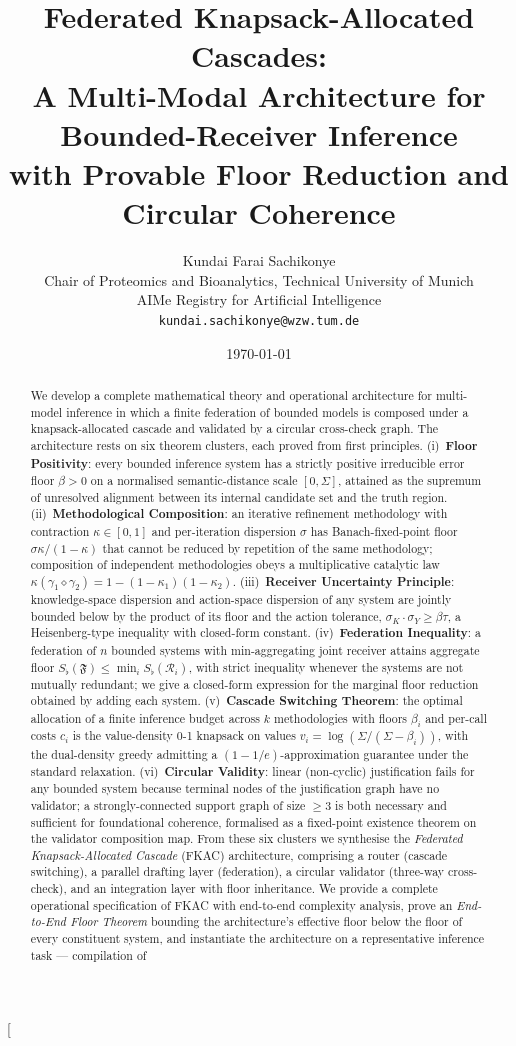\documentclass[11pt,twocolumn,a4paper]{article}
\title{\textbf{Federated Knapsack-Allocated Cascades:\\[3pt]
A Multi-Modal Architecture for Bounded-Receiver Inference\\[1pt]
with Provable Floor Reduction and Circular Coherence}}
\author{Kundai Farai Sachikonye\\
\small Chair of Proteomics and Bioanalytics, Technical University of Munich\\
\small AIMe Registry for Artificial Intelligence\\
\small \texttt{kundai.sachikonye@wzw.tum.de}}
\date{\today}
\theoremstyle{definition}
\theoremstyle{remark}
\newcommand{\Federation}{\mathfrak{F}}
\newcommand{\receiver}{\mathcal{R}}
\newcommand{\Sigmax}{\Sigma}
\newcommand{\Sfloor}{S_{\flat}}
\newcommand{\catpow}{\kappa}
\newcommand{\disp}{\sigma}
\newcommand{\Compose}{\diamond}
\begin{document}
\makeatletter
\twocolumn[%
  \begin{@twocolumnfalse}
    \maketitle
    \begin{abstract}
\noindent
We develop a complete mathematical theory and operational architecture for multi-model inference in which a finite federation of bounded models is composed under a knapsack-allocated cascade and validated by a circular cross-check graph. The architecture rests on six theorem clusters, each proved from first principles. (i)~\textbf{Floor Positivity}: every bounded inference system has a strictly positive irreducible error floor $\beta > 0$ on a normalised semantic-distance scale ${[0,\Sigmax]}$, attained as the supremum of unresolved alignment between its internal candidate set and the truth region. (ii)~\textbf{Methodological Composition}: an iterative refinement methodology with contraction $\catpow \in {[0,1]}$ and per-iteration dispersion $\disp$ has Banach-fixed-point floor $\disp\catpow/(1-\catpow)$ that cannot be reduced by repetition of the same methodology; composition of independent methodologies obeys a multiplicative catalytic law $\catpow(\gamma_1 \Compose \gamma_2) = 1 - (1-\catpow_1)(1-\catpow_2)$. (iii)~\textbf{Receiver Uncertainty Principle}: knowledge-space dispersion and action-space dispersion of any system are jointly bounded below by the product of its floor and the action tolerance, $\disp_K \cdot \disp_Y \geq \beta \tau$, a Heisenberg-type inequality with closed-form constant. (iv)~\textbf{Federation Inequality}: a federation of $n$ bounded systems with min-aggregating joint receiver attains aggregate floor $\Sfloor(\Federation) \leq \min_i \Sfloor(\receiver_i)$, with strict inequality whenever the systems are not mutually redundant; we give a closed-form expression for the marginal floor reduction obtained by adding each system. (v)~\textbf{Cascade Switching Theorem}: the optimal allocation of a finite inference budget across $k$ methodologies with floors $\beta_i$ and per-call costs $c_i$ is the value-density 0-1 knapsack on values $v_i = \log(\Sigmax/(\Sigmax - \beta_i))$, with the dual-density greedy admitting a $(1-1/e)$-approximation guarantee under the standard relaxation. (vi)~\textbf{Circular Validity}: linear (non-cyclic) justification fails for any bounded system because terminal nodes of the justification graph have no validator; a strongly-connected support graph of size $\geq 3$ is both necessary and sufficient for foundational coherence, formalised as a fixed-point existence theorem on the validator composition map. From these six clusters we synthesise the \emph{Federated Knapsack-Allocated Cascade} (FKAC) architecture, comprising a router (cascade switching), a parallel drafting layer (federation), a circular validator (three-way cross-check), and an integration layer with floor inheritance. We provide a complete operational specification of FKAC with end-to-end complexity analysis, prove an \emph{End-to-End Floor Theorem} bounding the architecture's effective floor below the floor of every constituent system, and instantiate the architecture on a representative inference task --- compilation of 
\end{abstract}
\end{@twocolumnfalse}
\end{document}
